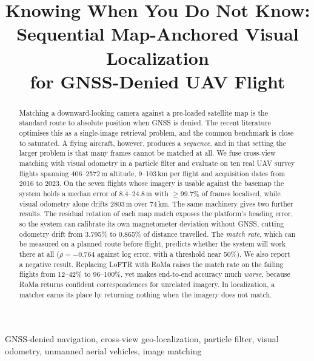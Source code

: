 \documentclass[conference]{IEEEtran}
\begin{document}
\title{Knowing When You Do Not Know:\\
Sequential Map-Anchored Visual Localization\\
for GNSS-Denied UAV Flight}

\author{
}

\maketitle

\begin{abstract}
Matching a downward-looking camera against a pre-loaded satellite map is the
standard route to absolute position when GNSS is denied. The recent literature
optimises this as a single-image retrieval problem, and the common benchmark
is close to saturated. A flying aircraft, however, produces a \emph{sequence},
and in that setting the larger problem is that many frames cannot be matched
at all. We fuse
cross-view matching with visual odometry in a particle filter and evaluate on
ten real UAV survey flights spanning 406--2572\,m altitude, 9--103\,km per
flight and acquisition dates from 2016 to 2023. On the seven flights whose
imagery is usable against the basemap the system holds a median error of
8.4--24.8\,m with $\geq$99.7\% of frames localised, while visual odometry
alone drifts 2803\,m over 74\,km. The same machinery gives two further
results. The residual rotation of each map match exposes the platform's
heading error, so the system can calibrate its own magnetometer deviation
without GNSS, cutting odometry drift from 3.795\% to 0.865\% of distance
travelled. The \emph{match rate}, which can be measured on a planned route
before flight, predicts whether the system will work there at all
($\rho=-0.764$ against log error, with a threshold near 50\%). We also report
a negative result. Replacing LoFTR with RoMa raises the match rate on the
failing flights from 12--42\% to 96--100\%, yet makes end-to-end accuracy much
\emph{worse}, because RoMa returns confident correspondences for unrelated
imagery. In localization, a matcher earns its place by returning nothing when
the imagery does not match.
\end{abstract}

\begin{IEEEkeywords}
GNSS-denied navigation, cross-view geo-localization, particle filter, visual
odometry, unmanned aerial vehicles, image matching
\end{IEEEkeywords}
\end{document}
